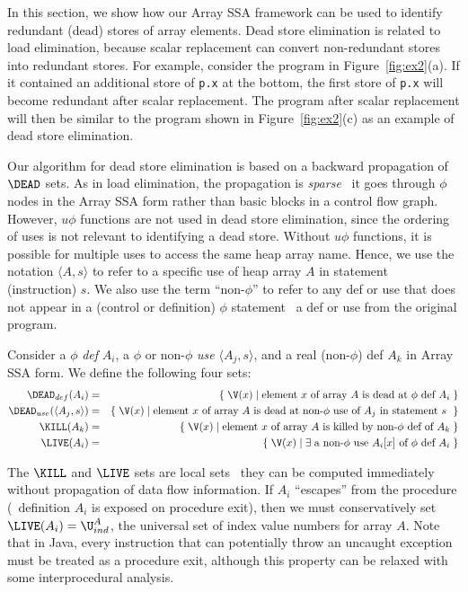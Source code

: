 In this section, we show how our Array SSA framework can be used to
identify redundant (dead) stores of array elements.  Dead store
elimination is related to load elimination, because scalar
replacement can convert non-redundant stores into redundant stores.
For example, consider the program in
Figure~\ref{fig:ex2}(a).  If it contained an additional
store of {\tt p.x} at the bottom, the first store of {\tt p.x} will
become redundant after scalar replacement.  The program after scalar
replacement will then be similar to the program shown in
Figure~\ref{fig:ex2}(c) as an example of dead
store elimination.

Our algorithm for dead store elimination is based on a backward
propagation of $\DEAD$ sets.  As in load elimination,
the propagation is {\it sparse} \ie\ it goes through $\phi$ nodes in
the Array SSA form rather than basic blocks in a control flow graph.
However, $u\phi$ functions are not used in
dead store elimination, since the ordering of uses is not relevant
to identifying a dead store.
Without $u\phi$ functions, it is possible for
multiple uses to access the same heap array name.
Hence, we use the notation $\langle A,s \rangle$
to refer to a specific use of
heap array $A$ in statement (instruction) $s$.
We also
use the term ``non-$\phi$'' to refer to any def or use that does not
appear in a (control or definition)
$\phi$ statement \ie\ a def or use from the original program.

Consider a $\phi$ {\it def} $A_i$, a $\phi$ or non-$\phi$ {\it use} $\langle A_j, s \rangle$, and a real
(non-$\phi$) def $A_k$ in Array SSA form.  We define the following
four sets:
\begin{eqnarray*}
\DEAD_{def}(A_i) & = & \{\; \V(x) \; | \; 
\mbox{element $x$ of array $A$ is dead at $\phi$ def $A_i$} \;\} \\
\DEAD_{use}(\langle A_j,s \rangle) & = & \{\; \V(x) \; | \; 
\mbox{element $x$ of array $A$ is dead at non-$\phi$ use of $A_j$ in statement $s$ } \;\} \\
\KILL(A_k) & = & \{\; \V(x) \;|\; \mbox{element $x$ of array $A$ is killed by
non-$\phi$ def of $A_k$} \;\}\\
\LIVE(A_i) & = & \{ \; \V(x) \;| \; \exists \; \mbox{a non-$\phi$ use $A_i[x]$ of
$\phi$ def $A_i$}\;\}
\end{eqnarray*}

The $\KILL$ and $\LIVE$ sets are local sets \ie\ they can be computed 
immediately
without propagation of data flow information.
If $A_i$ ``escapes'' from the procedure (\ie\ definition
$A_i$ is exposed on procedure exit), then we must conservatively
set $\LIVE(A_i) = \U^A_{ind}$, the universal set of index value numbers
for array $A$.  Note that in Java, every instruction that can potentially
throw an uncaught exception must be treated as a procedure exit, although this
property can be relaxed with some interprocedural analysis.

